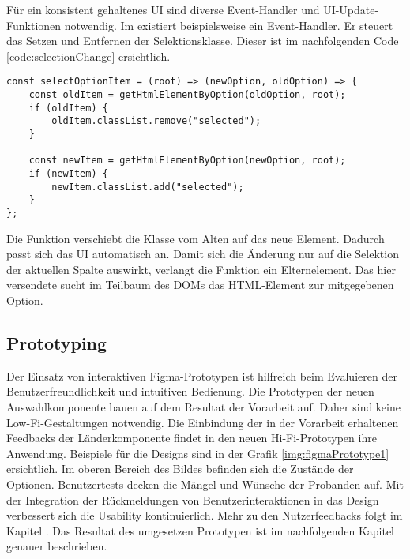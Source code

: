 Für ein konsistent gehaltenes UI sind diverse Event-Handler und UI-Update-Funk\-tion\-en notwendig. 
Im  existiert beispielsweise ein Event-Hand\-ler. 
Er steuert das Setzen und Entfernen der Selektionsklasse. 
Dieser ist im nachfolgenden Code \ref{code:selectionChange} ersichtlich. 

\begin{lstlisting}[style = htmlcssjs, caption = Änderung der Selektion, label = code:selectionChange]
const selectOptionItem = (root) => (newOption, oldOption) => {
    const oldItem = getHtmlElementByOption(oldOption, root);
    if (oldItem) {
        oldItem.classList.remove("selected");
    }

    const newItem = getHtmlElementByOption(newOption, root);
    if (newItem) {
        newItem.classList.add("selected");
    }
}; 
\end{lstlisting}

Die Funktion  verschiebt die Klasse  vom Alten auf das neue Element. 
Dadurch passt sich das UI automatisch an. 
Damit sich die Änderung nur auf die Selektion der aktuellen Spalte auswirkt, verlangt die Funktion ein Elternelement. 
Das hier versendete  sucht im Teilbaum des DOMs das HTML-Element zur mitgegebenen Option. 


\subsection{Prototyping}
\label{sec:userFeedbackPrototyping}

Der Einsatz von interaktiven Figma-Prototypen ist hilfreich beim Evaluieren der Benutzerfreundlichkeit und intuitiven Bedienung. 
Die Prototypen der neuen Auswahlkomponente bauen auf dem Resultat der Vorarbeit auf. 
Daher sind keine Low-Fi-Gestaltungen notwendig. 
Die Einbindung der in der Vorarbeit erhaltenen Feedbacks der Länderkomponente findet in den neuen Hi-Fi-Prototypen ihre Anwendung. 
Beispiele für die Designs sind in der Grafik \ref{img:figmaPrototype1} ersichtlich. 
Im oberen Bereich des Bildes befinden sich die Zustände der Optionen. 
Benutzertests decken die Mängel und Wünsche der Probanden auf. 
Mit der Integration der Rückmeldungen von Benutzerinteraktionen in das Design verbessert sich die Usability kontinuierlich. 
Mehr zu den Nutzerfeedbacks folgt im Kapitel \textbf{}. 
Das Resultat des umgesetzen Prototypen ist im nachfolgenden Kapitel genauer beschrieben. 


